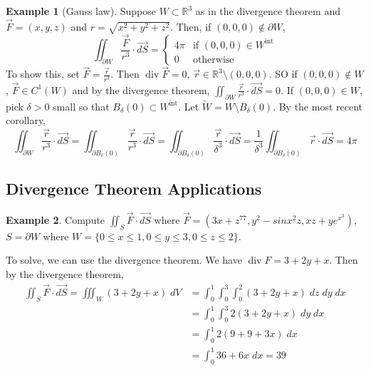 \documentclass[11pt]{article}
\theoremstyle{definition}
\newtheorem{exmp}{Example}[section]
\theoremstyle{definition}
\newcommand{\R}[0]{\mathbb{R}}
\DeclareMathOperator{\dive}{div}
\theoremstyle{definition}
\theoremstyle{remark}
\begin{document}
\begin{exmp}[Gauss law]
    Suppose $W \subset \R^3$ as in the divergence theorem and $\vec{F} = (x, y, z)$ and $r = \sqrt{x^2 + y^2 + z^2}$. Then, if $(0, 0, 0) \notin \partial W$,
    \[
        \iint_{\partial W} \frac{\vec{F}}{r^3} \cdot \vec{dS} = \begin{cases}
        4 \pi & \text{if } (0, 0, 0) \in W^{\text{int}} \\
        0 & \text{otherwise}
        \end{cases}
    \]    
    To show this, set $\vec{F} = \frac{\vec{r}}{r^3}$. Then $\dive \vec{F} = 0$, $\vec{r} \in \R^3 \setminus (0, 0, 0)$. SO if $(0, 0, 0) \notin W$, $\vec{F} \in C^1(W)$ and by
    the divergence theorem, $\iint_{\partial W} \frac{\vec{r}}{r^3} \cdot \vec{dS} = 0$. If $(0, 0, 0) \in W$, pick $\delta > 0$ small so that $B_{\delta}(0) \subset W^{\text{int}}$.
    Let $\tilde{W} = W \setminus B_{\delta}(0)$. By the most recent corollary,
    \[
        \iint_{\partial W} \frac{\vec{r}}{r^3} \cdot \vec{dS} = \iint_{\partial B_{\delta}(0)} \frac{\vec{r}}{r^3} \cdot \vec{dS} = \iint_{\partial B_{\delta}(0)} \frac{\vec{r}}{\delta^3} \cdot \vec{dS} = \frac{1}{\delta^3} \iint_{\partial B_{\delta}(0)} \vec{r} \cdot \vec{dS} = 4 \pi
    \]                
\end{exmp}

\subsection{Divergence Theorem Applications}

\begin{exmp}
    Compute $\iint_S \vec{F} \cdot \vec{dS}$ where $\vec{F} = (3x + z^{77}, y^2 - sinx^2 z, xz + ye^{x^3})$,  
    $S = \partial W$ where $W = \{0 \leq x \leq 1, 0 \leq y \leq 3, 0 \leq z \leq 2 \}$.
    
    To solve, we can use the divergence theorem. We have $\dive F = 3 + 2y + x$. Then by the divergence theorem,
    \begin{align*}
        \iint_S \vec{F} \cdot \vec{dS} = \iiint_W (3 + 2y + x) \; dV &= \int_0^1 \int_0^3 \int_0^2 (3 + 2y + x) \; dz \; dy \; dx \\
        &= \int_0^1 \int_0^3 2(3 + 2y + x) \; dy \; dx \\
        &= \int_0^1 2(9 + 9 + 3x) \; dx \\
        &= \int_0^1 36 + 6x \; dx = 39
    \end{align*} 
\end{exmp}
\end{document}
